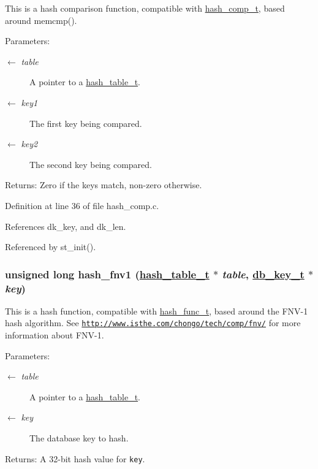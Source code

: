 This is a hash comparison function, compatible with \hyperlink{group__dbprim__hash_ga5}{hash\_\-comp\_\-t}, based around memcmp().

\begin{Desc}
\item[Parameters:]
\begin{description}
\item[\mbox{$\leftarrow$} {\em table}]A pointer to a \hyperlink{group__dbprim__hash_ga1}{hash\_\-table\_\-t}. \item[\mbox{$\leftarrow$} {\em key1}]The first key being compared. \item[\mbox{$\leftarrow$} {\em key2}]The second key being compared.\end{description}
\end{Desc}
\begin{Desc}
\item[Returns:]Zero if the keys match, non-zero otherwise.\end{Desc}


Definition at line 36 of file hash\_\-comp.c.

References dk\_\-key, and dk\_\-len.

Referenced by st\_\-init().\hypertarget{group__dbprim__hash_ga7}{
\subsubsection[hash\_\-fnv1]{\setlength{\rightskip}{0pt plus 5cm}unsigned long hash\_\-fnv1 (\hyperlink{struct__hash__table__s}{hash\_\-table\_\-t} $\ast$ {\em table}, \hyperlink{struct__db__key__s}{db\_\-key\_\-t} $\ast$ {\em key})}}
\label{group__dbprim__hash_ga7}


This is a hash function, compatible with \hyperlink{group__dbprim__hash_ga4}{hash\_\-func\_\-t}, based around the FNV-1 hash algorithm. See \href{http://www.isthe.com/chongo/tech/comp/fnv/}{\tt http://www.isthe.com/chongo/tech/comp/fnv/} for more information about FNV-1.

\begin{Desc}
\item[Parameters:]
\begin{description}
\item[\mbox{$\leftarrow$} {\em table}]A pointer to a \hyperlink{group__dbprim__hash_ga1}{hash\_\-table\_\-t}. \item[\mbox{$\leftarrow$} {\em key}]The database key to hash.\end{description}
\end{Desc}
\begin{Desc}
\item[Returns:]A 32-bit hash value for {\tt key}.\end{Desc}


